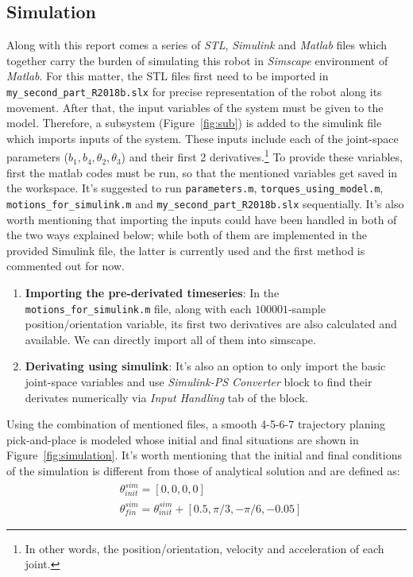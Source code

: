 \documentclass[conference]{IEEEtran}
\begin{document}
\subsection{Simulation}
Along with this report comes a series of \textit{STL}, \textit{Simulink} and \textit{Matlab} files which together carry the burden of simulating this robot in \textit{Simscape} environment of \textit{Matlab}. For this matter, the STL files first need to be imported in \texttt{my\_second\_part\_R2018b.slx} for precise representation of the robot along its movement. After that, the input variables of the system must be given to the model. Therefore, a subsystem (Figure~\ref{fig:sub}) is added to the simulink file which imports inputs of the system. These inputs include each of the joint-space parameters ($b_1, b_4, \theta_2, \theta_3$) and their first 2 derivatives.\footnote{In other words, the position/orientation, velocity and acceleration of each joint.} To provide these variables, first the matlab codes must be run, so that the mentioned variables get saved in the workspace. It's suggested to run \texttt{parameters.m}, \texttt{torques\_using\_model.m}, \texttt{motions\_for\_simulink.m} and \texttt{my\_second\_part\_R2018b.slx} sequentially. It's also worth mentioning that importing the inputs could have been handled in both of the two ways explained below; while both of them are implemented in the provided Simulink file, the latter is currently used and the first method is commented out for now.
\begin{enumerate}
    \item \textbf{Importing the pre-derivated timeseries}: In the \texttt{motions\_for\_simulink.m} file, along with each $100001$-sample position/orientation variable, its first two derivatives are also calculated and available. We can directly import all of them into simscape.
    \item \textbf{Derivating using simulink}: It's also an option to only import the basic joint-space variables and use \textit{Simulink-PS Converter} block to find their derivates numerically via \textit{Input Handling} tab of the block.
\end{enumerate}
Using the combination of mentioned files, a smooth 4-5-6-7 trajectory planing pick-and-place is modeled whose initial and final situations are shown in Figure~\ref{fig:simulation}. It's worth mentioning that the initial and final conditions of the simulation is different from those of analytical solution and are defined as:
\begin{align*}
     & \theta_{init}^{sim} = [0, 0, 0, 0]                                     \\
     & \theta_{fin}^{sim} = \theta_{init}^{sim} + [0.5, \pi/3, -\pi/6, -0.05]
\end{align*}
\end{document}
